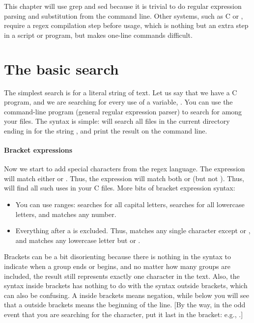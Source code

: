 This chapter will use grep and sed because it is trivial to do regular
expression parsing and substitution from the command line. Other
systems, such as C or , require a regex compilation step
before usage, which is nothing but an extra step in a script or program,
but makes one-line commands difficult. 

\section{The basic search}
The simplest search is for a literal string of text. Let us say that we
have a C program, and we are searching for every use of a variable,
. You can use the command-line program  (general
regular expression parser) to search for  among your files. The
syntax is simple:  will search all files in the current
directory ending in  for the string , and print the result
on the command line.



\paragraph{Bracket expressions} Now we start to add special characters
from the regex language. The expression \ci{[fs]} will match either
 or . Thus, the expression  will match both
 or  (but not ). Thus,  will find all such uses in your C files. More bits of
bracket expression syntax:

\begin{itemize}
\item You can use ranges: \ci{[A-Z]} searches for all capital letters,
\ci{[A-Za-z]} searches for all lowercase letters, and \ci{[0-9]} matches
any number. 
\item {} Everything after a \ci{\that} is excluded. Thus, \ci{[\that{}fs]} matches
any single character except  or , and
\ci{[a-z\that{}fs]} matches any lowercase letter
but  or .
\end{itemize}
Brackets can be a bit disorienting because there is nothing in the syntax
to indicate when a group ends or begins, and no matter how many groups are
included, the result still represents exactly one character in the text.
Also, the syntax inside brackets has nothing to do with the syntax
outside brackets, which can also be confusing. A \that{} inside brackets
means negation, while below you will see that a \that{} outside brackets
means the beginning of the line. [By the way, in the odd event that you are searching for the \that{} character, 
put it last in the bracket: e.g., .]


